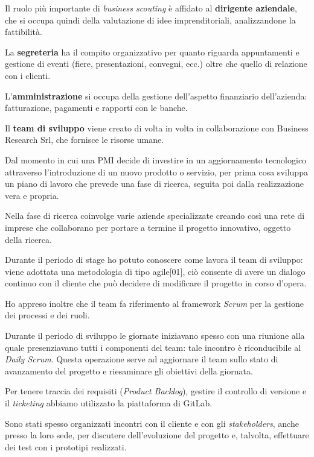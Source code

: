 Il ruolo più importante di \textit{business scouting} è affidato al \textbf{dirigente aziendale}, che si occupa quindi della valutazione di idee imprenditoriali, analizzandone la fattibilità.

La \textbf{segreteria} ha il compito organizzativo per quanto riguarda appuntamenti e gestione di eventi (fiere, presentazioni, convegni, ecc.) oltre che quello di relazione con i clienti.

L'\textbf{amministrazione} si occupa della gestione dell'aspetto finanziario dell'azienda: fatturazione, pagamenti e rapporti con le banche.

Il \textbf{team di sviluppo} viene creato di volta in volta in collaborazione con Business Research Srl, che fornisce le risorse umane.

\medskip

Dal momento in cui una PMI decide di investire in un aggiornamento tecnologico attraverso l'introduzione di un nuovo prodotto o servizio, \lab{} per prima cosa sviluppa un piano di lavoro che prevede una fase di ricerca, seguita poi dalla realizzazione vera e propria.

Nella fase di ricerca \lab{} coinvolge varie aziende specializzate creando così una rete di imprese che collaborano per portare a termine il progetto innovativo, oggetto della ricerca.

\medskip

Durante il periodo di stage ho potuto conoscere come lavora il team di sviluppo: viene adottata una metodologia di tipo agile[01], ciò consente di avere un dialogo continuo con il cliente che può decidere di modificare il progetto in corso d'opera.

Ho appreso inoltre che il team fa riferimento al framework \textit{Scrum} per la gestione dei processi e dei ruoli.

Durante il periodo di sviluppo le giornate iniziavano spesso con una riunione alla quale presenziavano tutti i componenti del team: tale incontro è riconducibile al \textit{Daily Scrum}. Questa operazione serve ad aggiornare il team sullo stato di avanzamento del progetto e riesaminare gli obiettivi della giornata.

Per tenere traccia dei requisiti (\textit{Product Backlog}), gestire il controllo di versione e il \textit{ticketing} abbiamo utilizzato la piattaforma di GitLab.

Sono stati spesso organizzati incontri con il cliente e con gli \textit{stakeholders}, anche presso la loro sede, per discutere dell'evoluzione del progetto e, talvolta, effettuare dei test con i prototipi realizzati.

